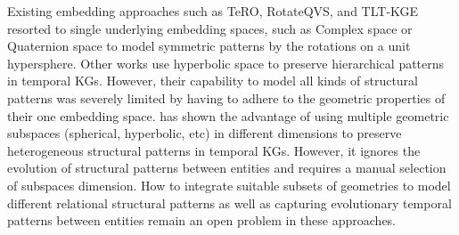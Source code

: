 \documentclass[letterpaper]{article} %
\begin{document}
Existing embedding approaches such as TeRO, RotateQVS, and TLT-KGE\cite{xu2020tero,chen2022rotateqvs,tltcomplexzhang2022along} resorted to single underlying embedding spaces, such as Complex space or Quaternion space to model symmetric patterns by the rotations on a unit hypersphere. Other works \cite{chami2020low,balazevic2019multi,herculemontella2021hyperbolic,han2020dyernie} use hyperbolic space to preserve hierarchical patterns in temporal KGs. However, their capability to model all kinds of structural patterns was severely limited by having to adhere to the geometric properties of their one embedding space. 
\cite{han2020dyernie} has shown the advantage of using multiple geometric subspaces (spherical, hyperbolic, etc) in different dimensions to preserve heterogeneous structural patterns in temporal KGs. However, it ignores the evolution of structural patterns between entities and requires a manual selection of subspaces dimension. How to integrate suitable subsets of geometries to model different relational structural patterns as well as capturing evolutionary temporal patterns between entities remain an open problem in these approaches. 
 
\end{document}
